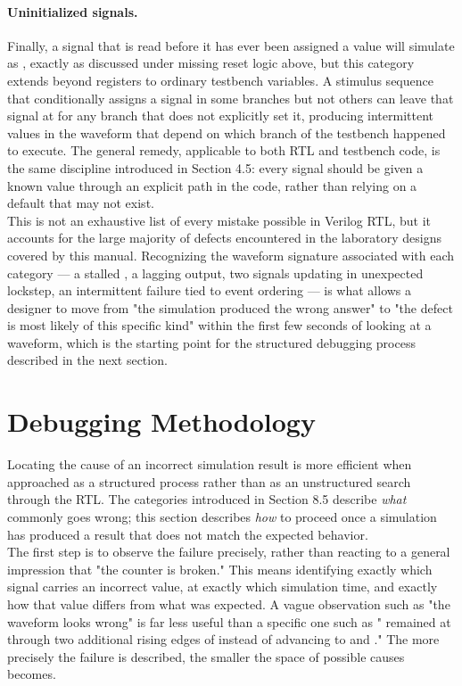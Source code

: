 \paragraph{Uninitialized signals.} Finally, a signal that is read before it has ever been assigned a value will simulate as , exactly as discussed under missing reset logic above, but this category extends beyond registers to ordinary testbench variables. A stimulus sequence that conditionally assigns a signal in some branches but not others can leave that signal at  for any branch that does not explicitly set it, producing intermittent  values in the waveform that depend on which branch of the testbench happened to execute. The general remedy, applicable to both RTL and testbench code, is the same discipline introduced in Section 4.5: every signal should be given a known value through an explicit path in the code, rather than relying on a default that may not exist.\\

This is not an exhaustive list of every mistake possible in Verilog RTL, but it accounts for the large majority of defects encountered in the laboratory designs covered by this manual. Recognizing the waveform signature associated with each category --- a stalled , a lagging output, two signals updating in unexpected lockstep, an intermittent failure tied to event ordering --- is what allows a designer to move from "the simulation produced the wrong answer" to "the defect is most likely of this specific kind" within the first few seconds of looking at a waveform, which is the starting point for the structured debugging process described in the next section.

\section{Debugging Methodology}

Locating the cause of an incorrect simulation result is more efficient when approached as a structured process rather than as an unstructured search through the RTL. The categories introduced in Section 8.5 describe \emph{what} commonly goes wrong; this section describes \emph{how} to proceed once a simulation has produced a result that does not match the expected behavior.\\

The first step is to observe the failure precisely, rather than reacting to a general impression that "the counter is broken." This means identifying exactly which signal carries an incorrect value, at exactly which simulation time, and exactly how that value differs from what was expected. A vague observation such as "the waveform looks wrong" is far less useful than a specific one such as " remained at  through two additional rising edges of  instead of advancing to  and ." The more precisely the failure is described, the smaller the space of possible causes becomes.\\

